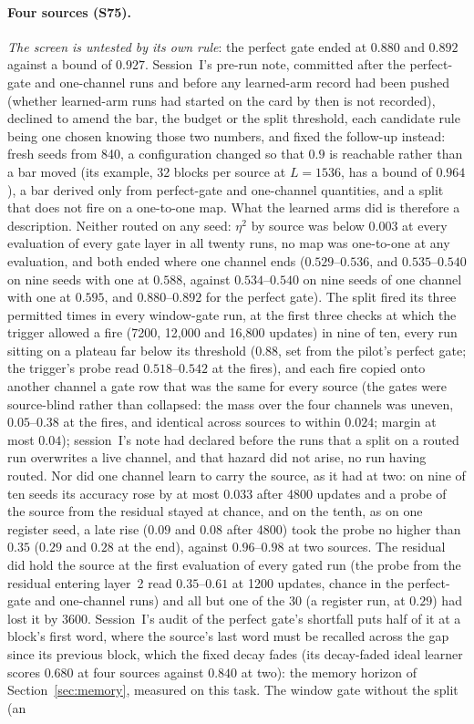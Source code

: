 \documentclass[11pt]{article}
\begin{document}
\paragraph{Four sources (S75).} \emph{The screen is untested by its own rule}: the perfect gate ended at $0.880$ and $0.892$ against a bound of $0.927$. Session~I's pre-run note, committed after the perfect-gate and one-channel runs and before any learned-arm record had been pushed (whether learned-arm runs had started on the card by then is not recorded), declined to amend the bar, the budget or the split threshold, each candidate rule being one chosen knowing those two numbers, and fixed the follow-up instead: fresh seeds from 840, a configuration changed so that $0.9$ is reachable rather than a bar moved (its example, 32 blocks per source at $L = 1536$, has a bound of $0.964$), a bar derived only from perfect-gate and one-channel quantities, and a split that does not fire on a one-to-one map. What the learned arms did is therefore a description. Neither routed on any seed: $\eta^2$ by source was below $0.003$ at every evaluation of every gate layer in all twenty runs, no map was one-to-one at any evaluation, and both ended where one channel ends ($0.529$--$0.536$, and $0.535$--$0.540$ on nine seeds with one at $0.588$, against $0.534$--$0.540$ on nine seeds of one channel with one at $0.595$, and $0.880$--$0.892$ for the perfect gate). The split fired its three permitted times in every window-gate run, at the first three checks at which the trigger allowed a fire (7200, 12{,}000 and 16{,}800 updates) in nine of ten, every run sitting on a plateau far below its threshold ($0.88$, set from the pilot's perfect gate; the trigger's probe read $0.518$--$0.542$ at the fires), and each fire copied onto another channel a gate row that was the same for every source (the gates were source-blind rather than collapsed: the mass over the four channels was uneven, $0.05$--$0.38$ at the fires, and identical across sources to within $0.024$; margin at most $0.04$); session~I's note had declared before the runs that a split on a routed run overwrites a live channel, and that hazard did not arise, no run having routed. Nor did one channel learn to carry the source, as it had at two: on nine of ten seeds its accuracy rose by at most $0.033$ after 4800 updates and a probe of the source from the residual stayed at chance, and on the tenth, as on one register seed, a late rise ($0.09$ and $0.08$ after 4800) took the probe no higher than $0.35$ ($0.29$ and $0.28$ at the end), against $0.96$--$0.98$ at two sources. The residual did hold the source at the first evaluation of every gated run (the probe from the residual entering layer~2 read $0.35$--$0.61$ at 1200 updates, chance in the perfect-gate and one-channel runs) and all but one of the 30 (a register run, at $0.29$) had lost it by 3600. Session~I's audit of the perfect gate's shortfall puts half of it at a block's first word, where the source's last word must be recalled across the gap since its previous block, which the fixed decay fades (its decay-faded ideal learner scores $0.680$ at four sources against $0.840$ at two): the memory horizon of Section~\ref{sec:memory}, measured on this task. The window gate without the split (an 
\end{document}
